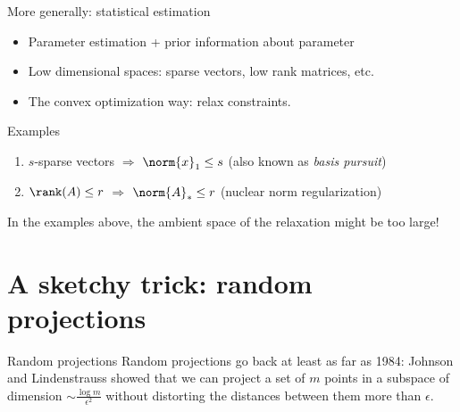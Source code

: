 \documentclass[11pt]{beamer}
\begin{document}
\begin{frame}{More generally: statistical estimation}
    \begin{itemize}
    \item Parameter estimation + prior information about parameter
    \item Low dimensional spaces: sparse vectors, low rank matrices, etc.
    \item The convex optimization way: relax constraints.
    \end{itemize}
    \begin{block}{Examples}
        \begin{enumerate}
            \item $s$-sparse vectors $\Rightarrow$ $\norm{x}_{1} \leq s$ 
            (also known as \textit{basis pursuit}) \\
            \item $\rank(A) \leq r$ $\Rightarrow$ $\norm{A}_{*} \leq r$ 
            (nuclear norm regularization)
        \end{enumerate}
    \end{block}
    In the examples above, the ambient space of the relaxation might be
    too large!
\end{frame}

\section{A sketchy trick: random projections}
\begin{frame}{Random projections}
    Random projections go back at least as far as 1984: Johnson and 
    Lindenstrauss showed that we can project a set of $m$ points
    in a subspace of dimension $\sim \frac{\log m}{\epsilon^2}$ without 
    distorting the distances between them more than $\epsilon$.
\end{frame}
\end{document}

